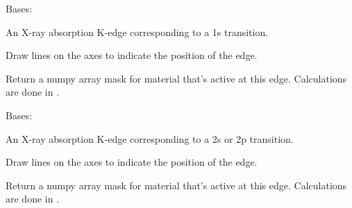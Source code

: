 \documentclass[letterpaper,10pt,english]{sphinxmanual}
\begin{document}
\begin{fulllineitems}
\label{\detokenize{xanespy:xanespy.edges.KEdge}}
Bases: {\hyperref[\detokenize{xanespy:xanespy.edges.Edge}]{}}

An X-ray absorption K-edge corresponding to a 1s transition.

\begin{fulllineitems}
\label{\detokenize{xanespy:xanespy.edges.KEdge.annotate_spectrum}}
Draw lines on the axes to indicate the position of the edge.

\end{fulllineitems}


\begin{fulllineitems}
\label{\detokenize{xanespy:xanespy.edges.KEdge.mask}}
Return a numpy array mask for material that’s active at this
edge. Calculations are done in .

\end{fulllineitems}


\end{fulllineitems}


\begin{fulllineitems}
\label{\detokenize{xanespy:xanespy.edges.LEdge}}
Bases: {\hyperref[\detokenize{xanespy:xanespy.edges.Edge}]{}}

An X-ray absorption K-edge corresponding to a 2s or 2p
transition.

\begin{fulllineitems}
\label{\detokenize{xanespy:xanespy.edges.LEdge.annotate_spectrum}}
Draw lines on the axes to indicate the position of the edge.

\end{fulllineitems}


\begin{fulllineitems}
\label{\detokenize{xanespy:xanespy.edges.LEdge.mask}}
Return a numpy array mask for material that’s active at this
edge. Calculations are done in .

\end{fulllineitems}


\end{fulllineitems}
\end{document}
